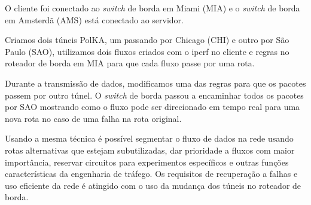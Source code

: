 \documentclass[12pt]{article}
\begin{document}
O cliente foi conectado ao \textit{switch} de borda em Miami (MIA) e o \textit{switch} de borda em Amsterdã (AMS) está conectado ao servidor.

Criamos dois túneis PolKA, um passando por Chicago (CHI) e outro por São Paulo (SAO), utilizamos dois fluxos criados com o iperf no cliente e regras no roteador de borda em MIA para que cada fluxo passe por uma rota.

Durante a transmissão de dados, modificamos uma das regras para que os pacotes passem por outro túnel. O \textit{switch} de borda passou a encaminhar todos os pacotes por SAO mostrando como o fluxo pode ser direcionado em tempo real para uma nova rota no caso de uma falha na rota original.

Usando a mesma técnica é possível segmentar o fluxo de dados na rede usando rotas alternativas que estejam subutilizadas, dar prioridade a fluxos com maior importância, reservar circuitos para experimentos específicos e outras funções características da engenharia de tráfego. Os requisitos de recuperação a falhas e uso eficiente da rede é atingido com o uso da mudança dos túneis no roteador de borda.



\end{document}
